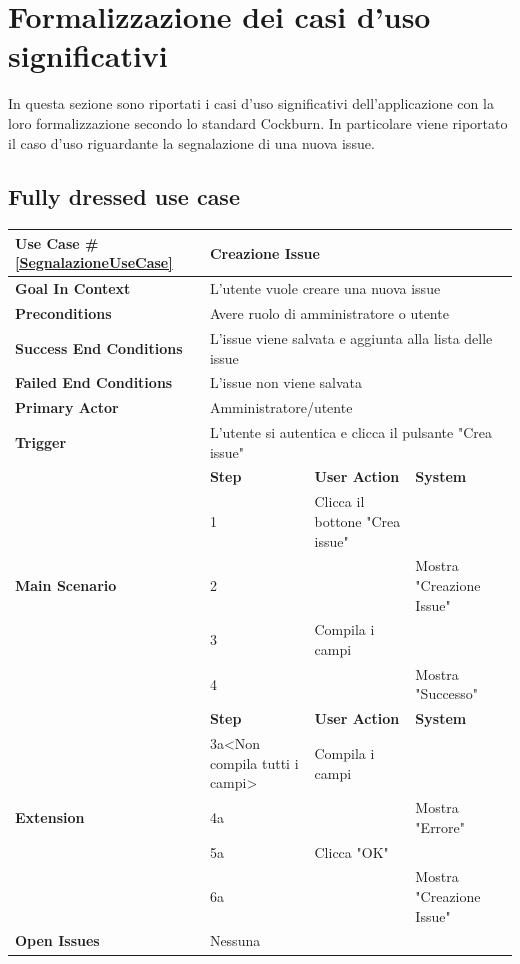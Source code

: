 \section{Formalizzazione dei casi d'uso significativi}
In questa sezione sono riportati i casi d'uso significativi dell'applicazione
con la loro formalizzazione secondo lo standard Cockburn.
In particolare viene riportato il caso d'uso riguardante la segnalazione di una nuova issue.

\subsection{Fully dressed use case}

\begin{table}[H]    
\small  
\def\arraystretch{1.3}

\begin{tabularx}{\linewidth}{|l|X|X|X|}

    \hline \textbf{Use Case} \#\ref{SegnalazioneUseCase} & 
    \multicolumn{3}{l|}{Creazione Issue} \\ 
    \hline \textbf{Goal In Context} & 
    \multicolumn{3}{p{10cm}|}{L'utente vuole creare una nuova issue} \\
    \hline \textbf{Preconditions} &
    \multicolumn{3}{p{10cm}|}{Avere ruolo di amministratore o utente} \\
    \hline \textbf{Success End Conditions} &
    \multicolumn{3}{p{10cm}|}{L'issue viene salvata e aggiunta alla lista delle issue} \\
    \hline \textbf{Failed End Conditions} &
    \multicolumn{3}{p{10cm}|}{L'issue non viene salvata} \\
    \hline \textbf{Primary Actor} &
    \multicolumn{3}{p{10cm}|}{Amministratore/utente} \\
    \hline \textbf{Trigger} & 
    \multicolumn{3}{p{10cm}|}{L'utente si autentica e clicca il pulsante "Crea issue"} \\
    \hline \multirow{5}{*}{\textbf{Main Scenario}} & \textbf{Step} & \textbf{User Action} & \textbf{System} \\
    \cline{2-4} & 1 & Clicca il bottone "Crea issue" & \\
    \cline{2-4} & 2 & & Mostra "Creazione Issue"\\
    \cline{2-4} & 3 & Compila i campi & \\
    \cline{2-4} & 4 &  & Mostra "Successo"\\
    \hline \multirow{5}{*}{\textbf{Extension}} & \textbf{Step} & \textbf{User Action} & \textbf{System} \\
    \cline{2-4} & 3a<Non compila tutti i campi> & Compila i campi & \\
    \cline{2-4} & 4a & & Mostra "Errore" \\
    \cline{2-4} & 5a & Clicca "OK" & \\
    \cline{2-4} & 6a & & Mostra "Creazione Issue" \\
    \hline \textbf{Open Issues} & \multicolumn{3}{l|}{Nessuna} \\
    \hline

\end{tabularx}

\end{table}